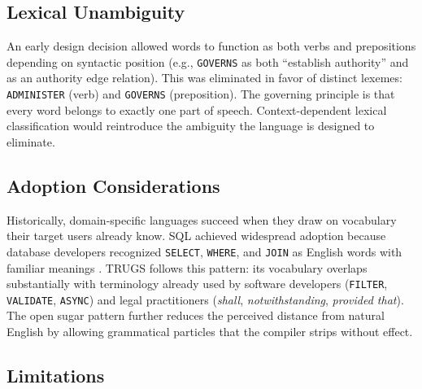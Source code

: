 \documentclass{article}
\begin{document}
\subsection{Lexical Unambiguity}

An early design decision allowed words to function as both verbs and prepositions depending on syntactic position (e.g., \texttt{GOVERNS} as both ``establish authority'' and as an authority edge relation). This was eliminated in favor of distinct lexemes: \texttt{ADMINISTER} (verb) and \texttt{GOVERNS} (preposition). The governing principle is that every word belongs to exactly one part of speech. Context-dependent lexical classification would reintroduce the ambiguity the language is designed to eliminate.

\subsection{Adoption Considerations}

Historically, domain-specific languages succeed when they draw on vocabulary their target users already know. SQL achieved widespread adoption because database developers recognized \texttt{SELECT}, \texttt{WHERE}, and \texttt{JOIN} as English words with familiar meanings \citep{chamberlin2012early}. TRUGS follows this pattern: its vocabulary overlaps substantially with terminology already used by software developers (\texttt{FILTER}, \texttt{VALIDATE}, \texttt{ASYNC}) and legal practitioners (\textit{shall}, \textit{notwithstanding}, \textit{provided that}). The open sugar pattern further reduces the perceived distance from natural English by allowing grammatical particles that the compiler strips without effect.

\subsection{Limitations}
\end{document}

